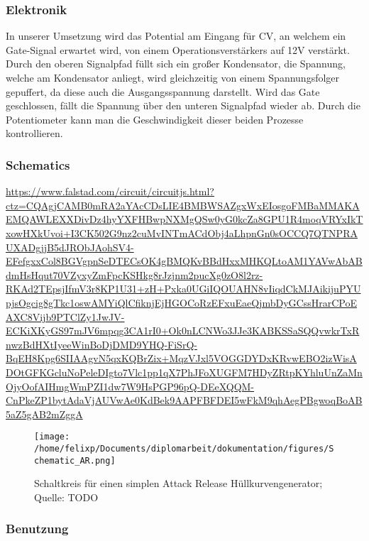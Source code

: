 \subsubsection{Elektronik}
\label{sec:org60e1c3d}
In unserer Umsetzung wird das Potential am Eingang für \acl{CV}, an welchem ein Gate-Signal erwartet wird, von einem Operationsverstärkers auf 12V verstärkt. Durch den oberen Signalpfad füllt sich ein großer Kondensator, die Spannung, welche am Kondensator anliegt, wird gleichzeitig von einem Spannungsfolger gepuffert, da diese auch die Ausgangsspannung darstellt. Wird das Gate geschlossen, fällt die Spannung über den unteren Signalpfad wieder ab. Durch die Potentiometer kann man die Geschwindigkeit dieser beiden Prozesse kontrollieren.
\subsubsection{Schematics}
\label{sec:org69ad6a7}
\url{https://www.falstad.com/circuit/circuitjs.html?ctz=CQAgjCAMB0mRA2aYAcCDsLIE4BMBWSAZgxWxEIosgoFMBaMMAKAEMQAWLEXXDivDz4hyYXFHBwpNXMgQSw0yG0kcZa8GPU1R4moqVRYxIkTxowHXkUvoi+I3CK502G9nz2cuMvINTmACdObj4aLhpnGn0sOCCQ7QTNPRAUXADgjjB5dJRObJAohSV4-EFefgxxCol8BGVgpnSeDTECsOK4gBMQKvBBdHxxMHKQLtoAM1YAVwAbABdmHsHqut70VZyxyZmFpcKSHkg8rJzjnm2pucXg0zO8l2rz-RKAd2TEpsjIfmV3r8KP1U31+zH+Pxka0UGiIQOUAHN8vIiqdCkMJAikijuPYUpjsOgcig8gTkc1oswAMYiQlCfiknjEjHGOCoRzEFxuEaeQjmbDyGCssHrarCPoEAXC8Vijb9PTClZy1JwJV-ECKiXKyGS97mJV6mpqg3CA1rI0+Ok0nLCNWo3JJe3KABKSSaSQQvwkrTxRnwzBdHXtIyeeWinBoDjDMD9YHQ-FiSrQ-BqEH8Kpg6SIIAAgvN5qxKQBrZix+MqzVJxl5VOGGDYDxKRvwEBO2izWisADOtGFKGcluNoPeleDIgto7Vlc1pp1qX7PhJFoXUGFM7HDyZRtpKYhluUnZaMnOjyOofAIHmgWmPZI1dw7W9HsPGP96pQ-DEeXQQM-CnPkeZP1bytAdaVjAUVwAe0KdBek9AAPFBFDEI5wFkM9qhAegPBgwoqBoAB5aZ5gAB2mZggA}
\begin{figure}[htbp]
\centering
\texttt{[image: /home/felixp/Documents/diplomarbeit/dokumentation/figures/Schematic\_AR.png]}
\caption{Schaltkreis für einen simplen Attack Release Hüllkurvengenerator; Quelle: TODO}
\end{figure}
\subsubsection{Benutzung}
\label{sec:org426459b}
